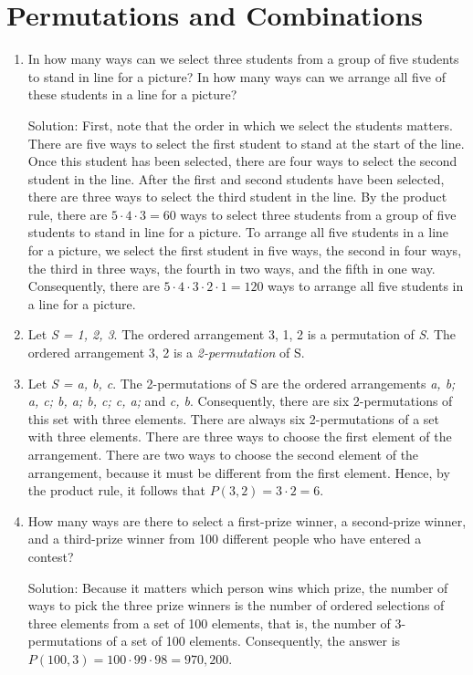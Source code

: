 \documentclass[11pt,a4paper]{book}
\begin{document}
\section{Permutations and Combinations}
\begin{enumerate}[label=Example~\arabic*]
\item In how many ways can we select three students from a group of five students to stand in line for a picture?
In how many ways can we arrange all five of these students in a line for a picture?

Solution: First, note that the order in which we select the students matters.
There are five ways to select the first student to stand at the start of the line.
Once this student has been selected, there are four ways to select the second student in the line.
After the first and second students have been selected, there are three ways to select the third student in the line.
By the product rule, there are $5 \cdot 4 \cdot 3 = 60$ ways to select three students from a group of five students to stand in line for a picture.
To arrange all five students in a line for a picture, we select the first student in five ways, the second in four ways, the third in three ways, the fourth in two ways, and the  fifth in one way.
Consequently, there are $5 \cdot 4 \cdot 3 \cdot 2 \cdot 1 = 120$ ways to arrange all five students in a line for a picture.

\item Let \emph{S = {1, 2, 3}}.
The ordered arrangement 3, 1, 2 is a permutation of \emph{S}.
The ordered arrangement 3, 2 is a \emph{2-permutation} of S.

\item Let \emph{S = {a, b, c}}. 
The 2-permutations of S are the ordered arrangements \emph{a, b; a, c; b, a; b, c; c, a;} and \emph{c, b}.
Consequently, there are six 2-permutations of this set with three elements.
There are always six 2-permutations of a set with three elements.
There are three ways to choose the first element of the arrangement.
There are two ways to choose the second element of the arrangement, because it must be different from the first element.
Hence, by the product rule, it follows that $P(3, 2) = 3 \cdot 2 = 6$.

\item How many ways are there to select a first-prize winner, a second-prize winner, and a third-prize winner from 100 different people who have entered a contest?

Solution: Because it matters which person wins which prize, the number of ways to pick the three prize winners is the number of ordered selections of three elements from a set of 100 elements, that is, the number of 3-permutations of a set of 100 elements.
Consequently, the answer is
$P(100, 3) = 100 \cdot 99 \cdot 98 = 970,200.$


\end{enumerate}
\end{document}
